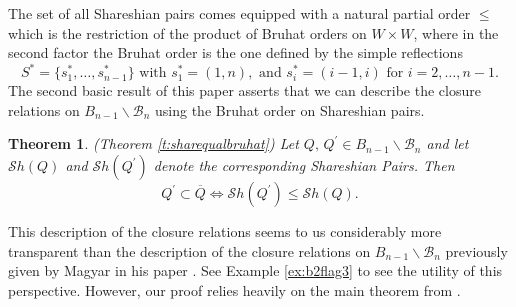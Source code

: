 \documentclass[12pt]{amsart}
\numberwithin{equation}{section}
\newtheorem{thm}{Theorem}[section]
\newcommand{\B}{\mathcal{B}}
\newcommand{\Borbitspace}{B_{n-1}\backslash\B_{n}}
\newcommand{\Sh}{\mathcal{S}h}
\begin{document}
The set of all Shareshian pairs comes equipped with a natural partial order $\leq$ which is the restriction of the product of Bruhat orders on $W\times W$, where in the second factor the Bruhat order is the one defined by the simple reflections 
\begin{equation}\label{eq:introgenerators}
S^{*}=\{s_{1}^{*}, \dots, s_{n-1}^{*}\}\mbox{ with } s_{1}^{*}=(1,n), \mbox{ and } s_{i}^{*}=(i-1,i)\mbox{ for }i=2,\dots, n-1.  
\end{equation}
The second basic result of this paper asserts that 
we can describe the closure relations on $\Borbitspace$ using the Bruhat order on Shareshian pairs.   
\begin{thm}\label{thm:introclosure} (Theorem \ref{t:sharequalbruhat})
Let $Q,\, Q^{\prime}\in\Borbitspace$ and let $\Sh(Q)$ and $\Sh(Q^{\prime})$ denote the corresponding Shareshian Pairs.  Then 
$$
Q^{\prime}\subset\overline{Q}\Leftrightarrow \Sh(Q^{\prime})\leq \Sh(Q). 
$$
\end{thm}
This description of the closure relations seems to us considerably more transparent than the description of the closure relations on $\Borbitspace$ previously given by Magyar in his paper \cite{Magyar}.  See Example \ref{ex:b2flag3} to see the utility of this perspective.   However, our proof relies heavily on the main theorem  from \cite{Magyar}.   
\end{document}
